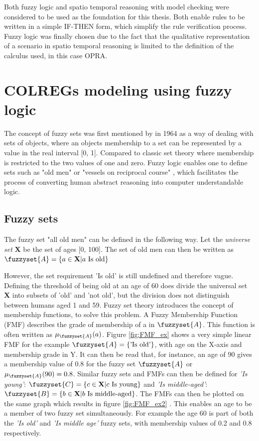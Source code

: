 Both fuzzy logic and spatio temporal reasoning with model checking were considered to be used as the foundation for this thesis. Both enable rules to be written in a simple IF-THEN form, which simplify the rule verification process. Fuzzy logic was finally chosen due to the fact that the qualitative representation of a scenario in spatio temporal reasoning is limited to the definition of the calculus used, in this case OPRA.
\chapter{COLREGs modeling using fuzzy logic}
\label{chap:fuzzy}
The concept of fuzzy sets was first mentioned by \textcite{zadeh1996fuzzy} in 1964 as a way of dealing with sets of objects, where an objects membership to a set can be represented by a value in the real interval [0, 1]. Compared to classic set theory where  membership is restricted to the two values of one and zero. Fuzzy logic enables one to define sets such as "old men" or "vessels on reciprocal course" \cite{zadeh1996fuzzy}, which facilitates the process of converting human abstract reasoning into computer understandable logic.
\section{Fuzzy sets}
\label{sec:fuzzy_sets}
The fuzzy set "all old men" can be defined in the following way. Let the \textit{universe set} \textbf{X} be the set of ages [0, 100]. The set of old men can then be written as
$\fuzzyset{A}=\left \{ a \in \textbf{X} | a \text{ Is old} \right \}$
\cite{chen2000introduction}

However, the set requirement 'Is old' is still undefined and therefore vague. Defining the threshold of being old at an age of 60 does divide the universal set \textbf{X} into subsets of 'old' and 'not old', but the division does not distinguish between humans aged 1 and 59.
Fuzzy set theory introduces the concept of membership functions, to solve this problem. A Fuzzy Membership Function (FMF) describes the grade of membership of a  in  $\fuzzyset{A}$. This function is often written as $\mu_{\fuzzyset{A}}(a)$. Figure \ref{fig:FMF_ex} shows a very simple linear FMF for the example $\fuzzyset{A}=\left \{\text{'Is old'} \right \}$, with age on the X-axis and membership grade in Y. It can then be read that, for instance, an age of 90 gives a membership value of 0.8 for the fuzzy set $\fuzzyset{A}$ or $\mu_{\fuzzyset{A}}(90)=0.8$. Similar fuzzy sets and  FMFs can then be defined for \textit{'Is young'}: $\fuzzyset{C}=\left \{ c \in \textbf{X} | c \text{ Is young} \right \}$ and   \textit{'Is middle-aged'}: $\fuzzyset{B}=\left \{ b \in \textbf{X} | b \text{ Is middle-aged} \right \}$. The FMFs can then be plotted on the same graph which results in figure \ref{fig:FMF_ex2} \cite{ross2009fuzzy}. This enables an age to be a member of two fuzzy set simultaneously. For example the age 60 is part of both the \textit{'Is old'} and \textit{'Is middle age'} fuzzy sets, with membership values of 0.2 and 0.8 respectively.

